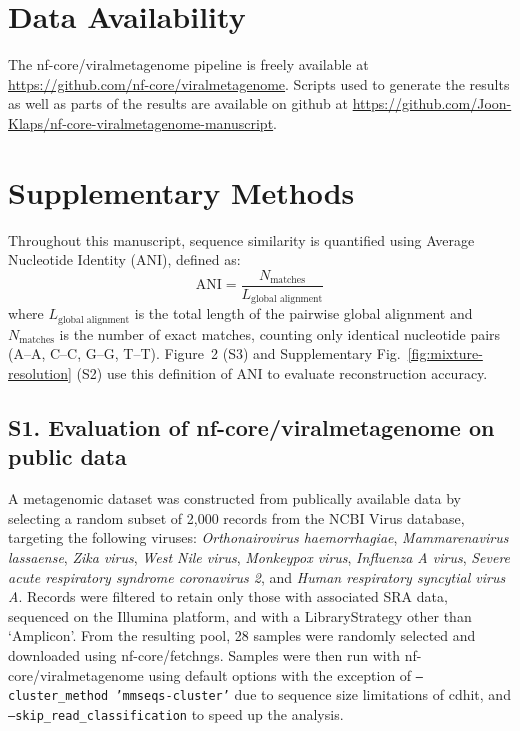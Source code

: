
\section*{Data Availability}
The nf-core/viralmetagenome pipeline is freely available at \url{https://github.com/nf-core/viralmetagenome}.
Scripts used to generate the results as well as parts of the results are available on github at \url{https://github.com/Joon-Klaps/nf-core-viralmetagenome-manuscript}.

\section*{Supplementary Methods}
Throughout this manuscript, sequence similarity is quantified using Average Nucleotide Identity (ANI), defined as:
\begin{equation}
    \text{ANI} = \frac{N_{\text{matches}}}{L_{\text{global alignment}}}
    \label{eq:ani}
\end{equation}
where $L_{\text{global alignment}}$ is the total length of the pairwise global alignment and $N_{\text{matches}}$ is the number of exact matches, counting only identical nucleotide pairs (A--A, C--C, G--G, T--T). Figure~2 (S3) and Supplementary Fig.~\ref{fig:mixture-resolution} (S2) use this definition of ANI to evaluate reconstruction accuracy.

\subsection*{S1. Evaluation of nf-core/viralmetagenome on public data}
A metagenomic dataset was constructed from publically available data by selecting a random subset of 2,000 records from the NCBI Virus database, targeting the following viruses: \textit{Orthonairovirus haemorrhagiae}, \textit{Mammarenavirus lassaense}, \textit{Zika virus}, \textit{West Nile virus}, \textit{Monkeypox virus}, \textit{Influenza A virus}, \textit{Severe acute respiratory syndrome coronavirus 2}, and \textit{Human respiratory syncytial virus A}. Records were filtered to retain only those with associated SRA data, sequenced on the Illumina platform, and with a LibraryStrategy other than `Amplicon'. From the resulting pool, 28 samples were randomly selected and downloaded using nf-core/fetchngs. Samples were then run with nf-core/viralmetagenome using default options with the exception of \texttt{--cluster\_method 'mmseqs-cluster'} due to sequence size limitations of cdhit, and \texttt{--skip\_read\_classification} to speed up the analysis.


